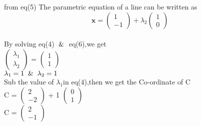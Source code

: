 \documentclass[journal,10pt,twocolumn]{article}
\newcommand{\myvec}[1]{\ensuremath{\begin{pmatrix}#1\end{pmatrix}}}
\begin{document}
\begin{flushleft}
from eq(5) The parametric equation of a line can be written as
\begin{equation}
     \boldsymbol{x} = \myvec{1 \\ -1} + \lambda_2\myvec{1 \\ 0}
\end{equation}
\vspace{0.3cm}\\
By solving eq(4) $\And$ eq(6),we get
\vspace{0.3cm}\\
 \myvec{\lambda_1 \\ \lambda_2} =  \myvec{1 \\ 1}
\vspace{0.3cm}\\
$\lambda_1=1 \And \lambda_2=1$
\vspace{0.3cm}\\
Sub the value of $\lambda_1$in eq(4),then we get the Co-ordinate of C
\vspace{0.3cm}\\
C =  \myvec{2 \\ -2} + 1  \myvec{0 \\ 1}
\vspace{0.3cm}\\
C = \myvec{2 \\ -1}

\end{flushleft}
\end{document}
